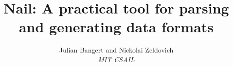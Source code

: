 \documentclass[10pt,twocolumn]{article}
\begin{document}
\author{Julian Bangert and Nickolai Zeldovich \\ \em MIT CSAIL}
\date{}
\title{Nail: A practical tool for parsing and generating data formats}

\maketitle








%



\small


\end{document}
